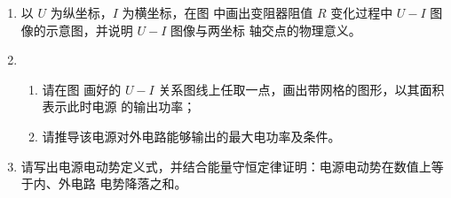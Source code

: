 \begin{enumerate}
\begin{enumerate}
\item
以 $ U $ 为纵坐标，$ I $ 为横坐标，在图 
中画出变阻器阻值 $ R $ 变化过程中 $ U-I $ 图
像的示意图，并说明 $ U-I $ 图像与两坐标
轴交点的物理意义。




\item 
\begin{enumerate}
\item
请在图  画好的 $ U-I $ 关系图线上任取一点，画出带网格的图形，以其面积表示此时电源
的输出功率；

\item 
请推导该电源对外电路能够输出的最大电功率及条件。


\end{enumerate}


\item 
请写出电源电动势定义式，并结合能量守恒定律证明：电源电动势在数值上等于内、外电路
电势降落之和。



\end{enumerate}


\end{enumerate}
